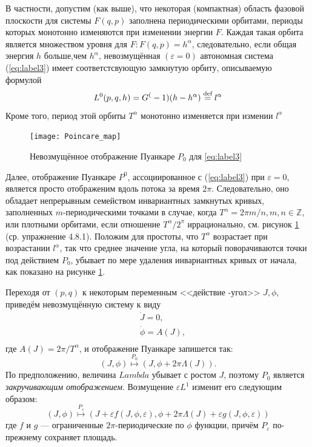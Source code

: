 \documentclass[twoside, a4paper]{article}
\begin{document}
В частности, допустим (как выше), что некоторая (компактная) область фазовой плоскости для системы $F(q,p)$ заполнена периодическими орбитами, периоды которых монотонно изменяются при изменении энергии $F$. Каждая такая орбита является множеством уровня для $F:F(q,p)=h^\alpha$, следовательно, если общая энергия $h$ больше,чем $h^\alpha$, невозмущённая $(\varepsilon=0)$ автономная система (\ref{eq:label3}) имеет соответстсвующую замкнутую орбиту, описываемую формулой
\begin{equation}
L^0(p,q,h)=G^(-1)(h-h^\alpha)\stackrel{\text{def}}{=} l^\alpha
\end{equation}
\renewcommand{\thefigure}{4.8.\arabic{figure}}
Кроме того, период этой орбиты $T^\alpha$ монотонно изменяется при измении $l^\alpha$
\begin{figure}[h]
\centering
\texttt{[image: Poincarе\_map]}
\caption{Невозмущённое отображение Пуанкаре $P_0$ для \ref{eq:label3}}
\label{fig:pic1}
\end{figure}

Далее, отображение Пуанкаре $P^0$, ассоциированное с (\ref{eq:label3}) при $\varepsilon = 0$, является просто отображеним вдоль потока за время $2\pi$. Следовательно, оно обладает непрерывным семейством инвариантных замкнутых кривых, заполненных $m$-периодическими точками в случае, когда $T^\alpha = 2\pi m/n, m,n \in \mathbb{Z}$, или плотными орбитами, если отношение $T^\alpha / 2^\pi$ иррационально, см. рисунок \ref{fig:pic1} (ср. упражнение 4.8.1). Положим для простоты, что $T^\alpha$ возрастает при возрастании $l^\alpha$, так что среднее значение угла, на который поворачиваются точки под действием $P_0$, убывает по мере удаления инвариантных кривых от начала, как показано на рисунке \ref{fig:pic1}.

Переходя от $(p,q)$ к некоторым переменным <<действие -угол>> $J,  \phi$, приведём невозмущённую систему к виду 
\begin{equation}
\text{~}\begin{aligned}
&\dot J = 0, \\
&\dot \phi = A(J),\\
\end{aligned}
\end{equation}
где $A(J) = 2\pi / T^\alpha$, и отображение Пуанкаре запишется так:
\begin{equation}
(J, \phi) \stackrel{P_0}{\longmapsto} (J, \phi + 2 \pi \Lambda (J)).
\label{eq:e4826}
\end{equation} 
По предположению, величина $Lambda$ убывает с ростом $J$, поэтому $P_0$ является \emph{закручивающим отображением}. Возмущение $\varepsilon L^1$ изменит его следующим образом: 
\begin{equation}
(J, \phi) \stackrel{P_\varepsilon}{\longmapsto} (J + \varepsilon f(J, \phi, \varepsilon), \phi + 2 \pi \Lambda (J) + \varepsilon g(J, \phi, \varepsilon))
\end{equation} 
где $f$ и $g$ --- ограниченные $2\pi$-периодические по $\phi$ функции, причём $P_\varepsilon$ по-прежнему сохраняет площадь.
\end{document}
